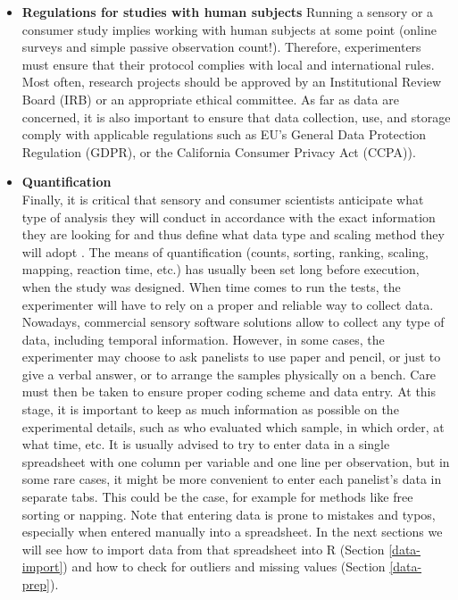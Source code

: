 \documentclass[
]{krantz}
\begin{document}
\begin{itemize}
\item
  \textbf{Regulations for studies with human subjects}
  Running a sensory or a consumer study implies working with human subjects at some point (online surveys and simple passive observation count!). Therefore, experimenters must ensure that their protocol complies with local and international rules. Most often, research projects should be approved by an Institutional Review Board (IRB) or an appropriate ethical committee. As far as data are concerned, it is also important to ensure that data collection, use, and storage comply with applicable regulations such as EU's General Data Protection Regulation (GDPR), or the California Consumer Privacy Act (CCPA)).
\item
  \textbf{Quantification}\\
  Finally, it is critical that sensory and consumer scientists anticipate what type of analysis they will conduct in accordance with the exact information they are looking for and thus define what data type and scaling method they will adopt \citep[see][ and \citet{LawlessHeym2010}]{omahony1986}. The means of quantification (counts, sorting, ranking, scaling, mapping, reaction time, etc.) has usually been set long before execution, when the study was designed. When time comes to run the tests, the experimenter will have to rely on a proper and reliable way to collect data. Nowadays, commercial sensory software solutions allow to collect any type of data, including temporal information. However, in some cases, the experimenter may choose to ask panelists to use paper and pencil, or just to give a verbal answer, or to arrange the samples physically on a bench. Care must then be taken to ensure proper coding scheme and data entry. At this stage, it is important to keep as much information as possible on the experimental details, such as who evaluated which sample, in which order, at what time, etc. It is usually advised to try to enter data in a single spreadsheet with one column per variable and one line per observation, but in some rare cases, it might be more convenient to enter each panelist's data in separate tabs. This could be the case, for example for methods like free sorting or napping. Note that entering data is prone to mistakes and typos, especially when entered manually into a spreadsheet. In the next sections we will see how to import data from that spreadsheet into R (Section \ref{data-import}) and how to check for outliers and missing values (Section \ref{data-prep}).
\end{itemize}
\end{document}
